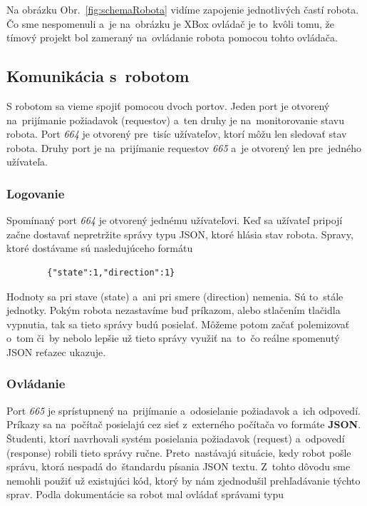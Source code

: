 Na obrázku Obr.~\ref{fig:schemaRobota} vidíme zapojenie jednotlivých častí robota. Čo sme nespomenuli a~je na~obrázku je XBox ovládač je to~kvôli tomu, že
tímový projekt bol zameraný na~ovládanie robota pomocou tohto ovládača.

\subsection{Komunikácia s~robotom}

S robotom sa vieme spojiť pomocou dvoch portov. Jeden port je otvorený na~prijímanie požiadavok (requestov) a~ten druhy je na~monitorovanie stavu robota. 
Port \textit{664} je otvorený pre~tisíc užívateľov, ktorí môžu len sledovať stav robota. Druhy port je na~prijímanie requestov \textit{665} a~je otvorený
len pre~jedného užívateľa.

\subsubsection{Logovanie}

Spomínaný port \textit{664} je otvorený jednému užívateľovi. Keď sa užívateľ pripojí začne dostavať nepretržite správy typu JSON, ktoré hlásia stav robota. Spravy,
ktoré dostávame sú nasledujúceho formátu
\begin{lstlisting}
		{"state":1,"direction":1}
\end{lstlisting}
Hodnoty sa pri stave (state) a~ani pri smere (direction) nemenia. Sú to~stále jednotky. Pokým robota nezastavíme buď príkazom, alebo stlačením tlačidla vypnutia,
tak sa tieto správy budú posielať. Môžeme potom začať polemizovať o~tom či~by nebolo lepšie už tieto správy využiť na~to~čo reálne spomenutý JSON reťazec ukazuje.

\subsubsection{Ovládanie}

Port \textit{665} je sprístupnený na~prijímanie a~odosielanie požiadavok a~ich odpovedí. Príkazy sa na~počítač posielajú cez sieť z~externého počítača vo formáte
\textbf{JSON}. Študenti, ktorí navrhovali systém posielania požiadavok (request) a~odpovedí (response) robili tieto správy ručne. Preto~nastávajú situácie, kedy
robot pošle správu, ktorá nespadá do~štandardu písania JSON textu. Z~tohto dôvodu sme nemohli použiť už existujúci kód, ktorý by nám zjednodušil prehľadávanie
týchto sprav. Podla dokumentácie sa robot mal ovládať správami typu~\cite{BMdoc}

